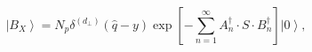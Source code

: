 \begin{equation}
\left| B_{X}\right\rangle \!=N_{p}\delta ^{\left( d_{\bot }\right) }
\left(\widehat{q}-y\right) \exp \left[ -\sum_{n=1}^{\infty }
A_{n}^{\dagger }\cdot S\cdot B_{n}^{\dagger }\right] \left| 0\right\rangle\!,
\label{db}
\end{equation}

